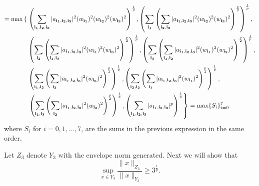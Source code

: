 \documentclass[12pt]{amsart}
\theoremstyle{definition}
\theoremstyle{remark}
\numberwithin{equation}{section}
\begin{document}
\begin{align*}
=\max\left\{\right . 
&\left(\sum_{\bf{i_1,i_2,i_3}}|a_{\bf{i_1,i_2,i_3}}|^2
(w_{\bf{i_1}})^{2}(w_{\bf{i_2}})^{2}(w_{\bf{i_3}})^{2}
\right)^{\frac{1}{2}},
\left(\sum_{\bf{i_1}}\left(\sum_{\bf{i_2,i_3}}
|a_{\bf{i_1,i_2,i_3}}|^2
(w_{\bf{i_2}})^{2}(w_{\bf{i_3}})^{2}\right)^{\frac{p}{2}}
\right)^{\frac{1}{p}},\\
&\left(\sum_{\bf{i_2}}\left(\sum_{\bf{i_1,i_3}}
|a_{\bf{i_1,i_2,i_3}}|^2
(w_{\bf{i_1}})^{2}(w_{\bf{i_3}})^{2}\right)^{\frac{p}{2}}
\right)^{\frac{1}{p}},
\left(\sum_{\bf{i_3}}\left(\sum_{\bf{i_1,i_2}}
|a_{\bf{i_1,i_2,i_3}}|^2
(w_{\bf{i_1}})^{2}(w_{\bf{i_2}})^{2}\right)^{\frac{p}{2}}
\right)^{\frac{1}{p}},\\
&\left(\sum_{\bf{i_1,i_2}}\left(\sum_{\bf{i_3}}
|a_{\bf{i_1,i_2,i_3}}|^2
(w_{\bf{i_3}})^{2}\right)^{\frac{p}{2}}
\right)^{\frac{1}{p}},
\left(\sum_{\bf{i_2,i_3}}\left(\sum_{\bf{i_1}}
|a_{\bf{i_1,i_2,i_3}}|^2
(w_{\bf{i_1}})^{2}\right)^{\frac{p}{2}}
\right)^{\frac{1}{p}},\\
&\left .\left(\sum_{\bf{i_1,i_3}}\left(\sum_{\bf{i_2}}
|a_{\bf{i_1,i_2,i_3}}|^2
(w_{\bf{i_2}})^{2}\right)^{\frac{p}{2}}
\right)^{\frac{1}{p}},
\left(\sum_{\bf{i_1,i_2,i_3}}
|a_{\bf{i_1,i_2,i_3}}|^p
\right)^{\frac{1}{p}}
\right\}
=\max\{S_i\}_{i=0}^{7}
\end{align*}
where $S_i$ for $i=0,1,\ldots,7$, are the sums
in the previous expression in the same order.

Let $Z_3$ denote $Y_3$ with the envelope norm generated.
Next we will show that 
$$
\sup_{x\in Y_3} 
\frac{\|x\|_{Z_3}}{\|x\|_{Y_3}} \ge 3^{\frac{1}{p}}.
$$
\end{document}
